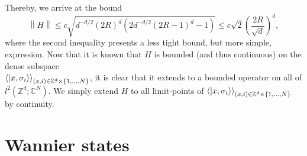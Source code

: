 \documentclass[a4paper,11pt]{article}
\newcommand{\norm}[1]{\left\lVert #1 \right\rVert}
\newcommand{\C}{\mathbb{C}}
\newcommand{\Z}{\mathbb{Z}}
\numberwithin{equation}{section}
\begin{document}
 	 Thereby, we arrive at the bound\begin{equation}
 	 \norm{H}\leq c\sqrt{ d^{-d/2} (2R)^d \left(2 d^{-d/2} (2 R-1)^d-1\right)}\leq c\sqrt{2}\left(\frac{2R}{\sqrt{d}}\right)^d,
 	 \end{equation}
 	 where the second inequality presents a less tight bound, but more simple, expression.
 	 Now that it is known that $ H $ is bounded (and thus continuous) on the dense subspace\\ $ \braket{\ket{x,\sigma_i}}_{(x,i)\in\Z^d\times\{1,...,N\}} $, it is clear that it extends to a bounded operator on all of $ l^2(\Z^d;\C^N) $. We simply extend $ H $ to all limit-points of $ \braket{\ket{x,\sigma_i}}_{(x,i)\in\Z^d\times\{1,...,N\}} $ by continuity.
 	 
 	 \section{Wannier states}
 	 
\end{document}

